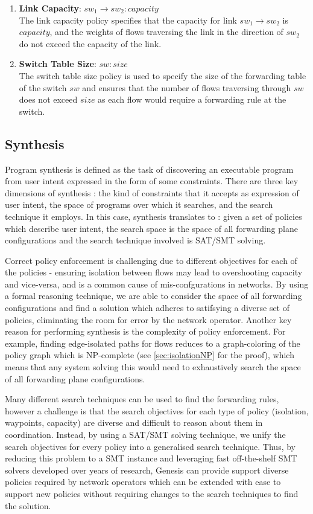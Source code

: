 \documentclass[]{sig}
\begin{document}
\begin{enumerate}
	\item \textbf{Link Capacity}: $sw_1 \rightarrow sw_2 : capacity$ \\
	The link capacity policy specifies that the capacity for link $sw_1 \rightarrow sw_2$ is $capacity$, and the weights of flows traversing the link in the direction of $sw_2$ do not exceed the capacity of the link.  
	\item \textbf{Switch Table Size}: $sw : size$ \\
	The switch table size policy is used to specify the size of the forwarding table of the switch $sw$ and ensures that the number of flows traversing through $sw$ does not exceed $size$ as each flow would require a forwarding rule at the switch.
\end{enumerate}
\subsection{Synthesis} \label{sec:synthesis}
Program synthesis is defined as the task of discovering an executable program from user intent expressed in the form of some constraints. There are three key dimensions of synthesis : the kind of constraints that it accepts as expression of user intent, the space of programs over which it searches, and the search technique it employs. In this case, synthesis translates to : given a set of policies which describe user intent, the search space is the space of all forwarding plane configurations and the search technique involved is SAT/SMT solving. 

Correct policy enforcement is challenging due to different objectives for each of the policies - ensuring isolation between flows may lead to overshooting capacity and vice-versa, and is a common cause of mis-confgurations in networks. By using a formal reasoning technique, we are able to consider the space of all forwarding configurations and find a solution which adheres to satifsying a diverse set of policies, eliminating the room for error by the network operator. Another key reason for performing synthesis is the complexity of policy enforcement. For example, finding edge-isolated paths for flows  reduces to a graph-coloring of the policy graph which is NP-complete (see \cref{sec:isolationNP} for the proof), which means that any system solving this would need to exhaustively search the space of all forwarding plane configurations. 

Many different search techniques can be used to find the forwarding rules, however a challenge is that the search objectives for each type of policy (isolation, waypoints, capacity) are diverse and difficult to reason about them in coordination. Instead, by using a SAT/SMT solving technique, we unify the search objectives for every policy into a generalised search technique. Thus, by reducing this problem to a SMT instance and leveraging fast off-the-shelf SMT solvers developed over years of research, Genesis can provide support diverse policies required by network operators which can be extended with ease to support new policies without requiring changes to the search techniques to find the solution. 
\end{document}
